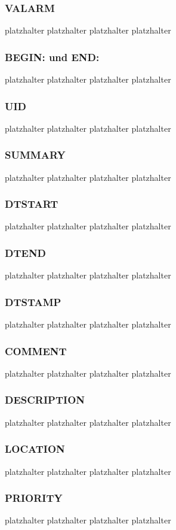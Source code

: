 \subsubsection{VALARM}
\label{sec:vAlarm} 
platzhalter platzhalter platzhalter platzhalter 
\subsubsection{BEGIN: und END:}
\label{sec:beginUndEnd} 
platzhalter platzhalter platzhalter platzhalter 
\subsubsection{UID}
\label{sec:uid}
platzhalter platzhalter platzhalter platzhalter 
\subsubsection{SUMMARY}
\label{sec:summary}
platzhalter platzhalter platzhalter platzhalter 
\subsubsection{DTSTART}
\label{sec:dtstart}
platzhalter platzhalter platzhalter platzhalter 
\subsubsection{DTEND}
\label{sec:dtend}
platzhalter platzhalter platzhalter platzhalter 
\subsubsection{DTSTAMP}
\label{sec:dtstamp}
platzhalter platzhalter platzhalter platzhalter 
\subsubsection{COMMENT}
\label{sec:comment}
platzhalter platzhalter platzhalter platzhalter 
\subsubsection{DESCRIPTION}
\label{sec:description}
platzhalter platzhalter platzhalter platzhalter 
\subsubsection{LOCATION}
\label{sec:location}
platzhalter platzhalter platzhalter platzhalter 
\subsubsection{PRIORITY}
\label{sec:priority}
platzhalter platzhalter platzhalter platzhalter 
